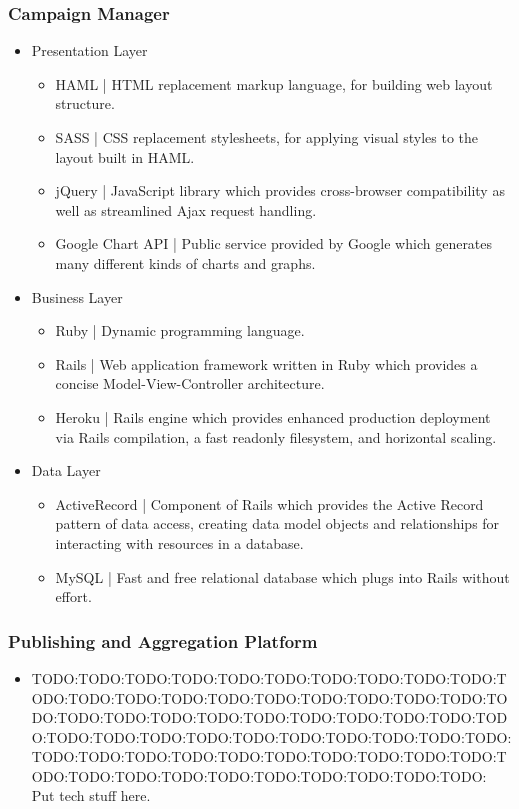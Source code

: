 \documentclass{article}
\begin{document}
\subsubsection{Campaign Manager}
\begin{itemize}
\item Presentation Layer
  \begin{itemize}
  \item HAML | HTML replacement markup language, for building web layout structure.
  \item SASS | CSS replacement stylesheets, for applying visual styles to the layout built in HAML.
  \item jQuery | JavaScript library which provides cross-browser compatibility as well as streamlined Ajax request handling.
  \item Google Chart API | Public service provided by Google which generates many different kinds of charts and graphs.
  \end{itemize}
\item Business Layer
  \begin{itemize}
  \item Ruby | Dynamic programming language.
  \item Rails | Web application framework written in Ruby which provides a concise Model-View-Controller architecture.
  \item Heroku | Rails engine which provides enhanced production deployment via Rails compilation, a fast readonly filesystem, and horizontal scaling.
  \end{itemize}
\item Data Layer
  \begin{itemize}
  \item ActiveRecord | Component of Rails which provides the Active Record pattern of data access, creating data model objects and relationships for interacting with resources in a database.
  \item MySQL | Fast and free relational database which plugs into Rails without effort.
  \end{itemize}
\end{itemize}
\subsubsection{Publishing and Aggregation Platform}
\begin{itemize}
\item TODO:TODO:TODO:TODO:TODO:TODO:TODO:TODO:TODO:TODO:TODO:TODO:TODO:TODO:TODO:TODO:TODO:TODO:TODO:TODO:TODO:TODO:TODO:TODO:TODO:TODO:TODO:TODO:TODO:TODO:TODO:TODO:TODO:TODO:TODO:TODO:TODO:TODO:TODO:TODO:TODO:TODO:TODO:TODO:TODO:TODO:TODO:TODO:TODO:TODO:TODO:TODO:TODO:TODO:TODO:TODO:TODO:TODO:TODO:TODO:TODO: Put tech stuff here.
\end{itemize}
\end{document}

